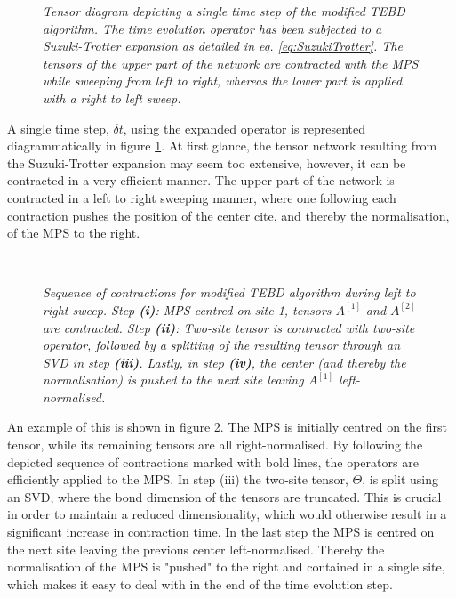 \begin{figure}[h!]
	\centering
	
	\caption{\textit{Tensor diagram depicting a single time step of the modified TEBD algorithm. The time evolution operator has been subjected to a Suzuki-Trotter expansion as detailed in eq. \eqref{eq:SuzukiTrotter}. The tensors of the upper part of the network are contracted with the MPS while sweeping from left to right, whereas the lower part is applied with a right to left sweep.}}
	\label{fig:ModifiedTEBD}
\end{figure}
A single time step, $\delta t$, using the expanded operator is represented diagrammatically in figure \ref{fig:ModifiedTEBD}. At first glance, the tensor network resulting from the Suzuki-Trotter expansion may seem too extensive, however, it can be contracted in a very efficient manner. The upper part of the network is contracted in a left to right sweeping manner, where one following each contraction pushes the position of the center cite, and thereby the normalisation, of the MPS to the right.
\begin{figure}
\centering %
\begin{subfigure}[b]{0.35\textwidth}
	\caption{}  
  	
\end{subfigure}
\begin{subfigure}[b]{0.35\textwidth}
	\caption{}    
  	
\end{subfigure}
\\ %
\vspace{10mm}
\begin{subfigure}[b]{0.35\textwidth}
	\caption{}    	
  	
\end{subfigure}
\begin{subfigure}[b]{0.35\textwidth}
	\caption{}  
  	
\end{subfigure}
\caption{\textit{Sequence of contractions for modified TEBD algorithm during left to right sweep. Step \textbf{(i)}: MPS centred on site 1, tensors $A^{[1]}$ and $A^{[2]}$ are contracted. Step \textbf{(ii)}: Two-site tensor is contracted with two-site operator, followed by a splitting of the resulting tensor through an SVD in step \textbf{(iii)}. Lastly, in step \textbf{(iv)}, the center (and thereby the normalisation) is pushed to the next site leaving $A^{[1]}$ left-normalised.}}
\label{fig:TEBDContraction}
\end{figure}
An example of this is shown in figure \ref{fig:TEBDContraction}. The MPS is initially centred on the first tensor, while its remaining tensors are all right-normalised. By following the depicted sequence of contractions marked with bold lines, the operators are efficiently applied to the MPS. In step (iii) the two-site tensor, $\Theta$, is split using an SVD, where the bond dimension of the tensors are truncated. This is crucial in order to maintain a reduced dimensionality, which would otherwise result in a significant increase in contraction time. In the last step the MPS is centred on the next site leaving the previous center left-normalised. Thereby the normalisation of the MPS is "pushed" to the right and contained in a single site, which makes it easy to deal with in the end of the time evolution step.
